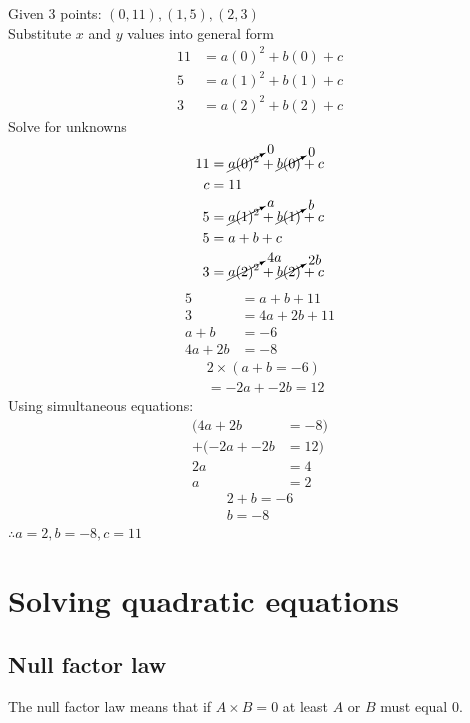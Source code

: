 \documentclass{book}
\begin{document}
\begin{center}
	Given 3 points: $(0, 11), (1, 5), (2, 3)$\\
	Substitute $x$ and $y$ values into general form
	\begin{align*}
		11 & = a(0)^2 + b(0) + c \\
		5  & = a(1)^2 + b(1) + c \\
		3  & = a(2)^2 + b(2) + c
	\end{align*}
	Solve for unknowns
	\begin{align*}
		11 & = \cancelto{0}{a(0)^2} + \cancelto{0}{b(0)} + c   \\
		c  & = 11                                              \\
		5  & = \cancelto{a}{a(1)^2} + \cancelto{b}{b(1)} + c   \\
		5  & = a + b + c                                       \\
		3  & = \cancelto{4a}{a(2)^2} + \cancelto{2b}{b(2)} + c \\
	\end{align*}
	\begin{align*}
		5       & = a + b + 11   \\
		3       & = 4a + 2b + 11 \\
		a + b   & = -6           \\
		4a + 2b & = -8
	\end{align*}
	\begin{align*}
		 & 2 \times (a + b = -6) \\
		 & = -2a + -2b = 12
	\end{align*}
	Using simultaneous equations:
	\begin{align*}
		(4a + 2b     & = -8) \\
		+ (-2a + -2b & = 12) \\
		2a           & = 4   \\
		a            & = 2
	\end{align*}
	\begin{align*}
		2 + b = -6 \\
		b = -8
	\end{align*}
	$\therefore a = 2, b = -8, c = 11$
\end{center}



\section{Solving quadratic equations}
\subsection{Null factor law}
The null factor law means that if $A \times B = 0$ at least $A$ or $B$ must equal 0.
\end{document}
